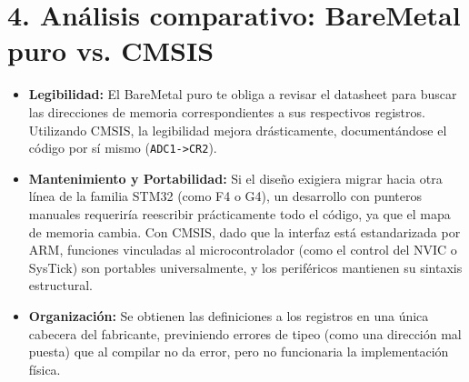 \section*{4. Análisis comparativo: BareMetal puro vs. CMSIS}
\begin{itemize}
    \item \textbf{Legibilidad:} El BareMetal puro te obliga a revisar el datasheet  para buscar las direcciones de memoria correspondientes a sus respectivos registros. Utilizando CMSIS, la legibilidad mejora drásticamente, documentándose el código por sí mismo (\texttt{ADC1->CR2}).
    \item \textbf{Mantenimiento y Portabilidad:} Si el diseño exigiera migrar hacia otra línea de la familia STM32 (como F4 o G4), un desarrollo con punteros manuales requeriría reescribir prácticamente todo el código, ya que el mapa de memoria cambia. Con CMSIS, dado que la interfaz está estandarizada por ARM, funciones vinculadas al microcontrolador (como el control del NVIC o SysTick) son portables universalmente, y los periféricos mantienen su sintaxis estructural.
    \item \textbf{Organización:} Se obtienen las definiciones a los registros en una única cabecera del fabricante, previniendo errores de tipeo (como una dirección mal puesta) que al compilar no da error, pero no funcionaria la implementación física.
\end{itemize}